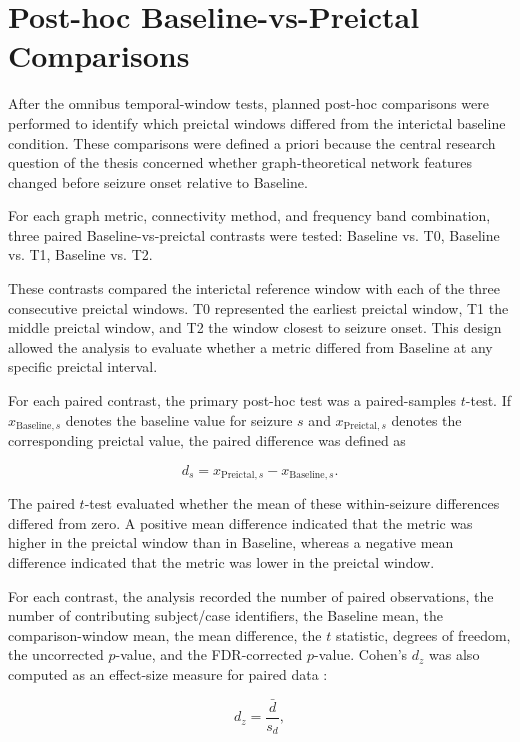 \section{Post-hoc Baseline-vs-Preictal Comparisons}
\label{sec:posthoc-baseline-preictal-comparisons}

After the omnibus temporal-window tests, planned post-hoc comparisons were
performed to identify which preictal windows differed from the interictal
baseline condition. These comparisons were defined a priori because the central
research question of the thesis concerned whether graph-theoretical network
features changed before seizure onset relative to Baseline.

For each graph metric, connectivity method, and frequency band combination,
three paired Baseline-vs-preictal contrasts were tested: Baseline vs. T0,
Baseline vs. T1,
Baseline vs. T2.

These contrasts compared the interictal reference window with each of the
three consecutive preictal windows. T0 represented the earliest preictal
window, T1 the middle preictal window, and T2 the window closest to seizure
onset. This design allowed the analysis to evaluate whether a metric differed
from Baseline at any specific preictal interval.

For each paired contrast, the primary post-hoc test was a paired-samples
$t$-test. If $x_{\mathrm{Baseline},s}$ denotes the baseline value for seizure
$s$ and $x_{\mathrm{Preictal},s}$ denotes the corresponding preictal value, the
paired difference was defined as

\[
    d_s =
    x_{\mathrm{Preictal},s}
    -
    x_{\mathrm{Baseline},s}.
\]

The paired $t$-test evaluated whether the mean of these within-seizure
differences differed from zero. A positive mean difference indicated that the
metric was higher in the preictal window than in Baseline, whereas a negative
mean difference indicated that the metric was lower in the preictal window.

For each contrast, the analysis recorded the number of paired observations, the
number of contributing subject/case identifiers, the Baseline mean, the
comparison-window mean, the mean difference, the $t$ statistic, degrees of
freedom, the uncorrected $p$-value, and the FDR-corrected $p$-value. 
Cohen's $d_z$ was also computed as an effect-size measure for paired data
\cite{Lakens2013}:

\[
    d_z =
    \frac{\bar{d}}{s_d},
\]


